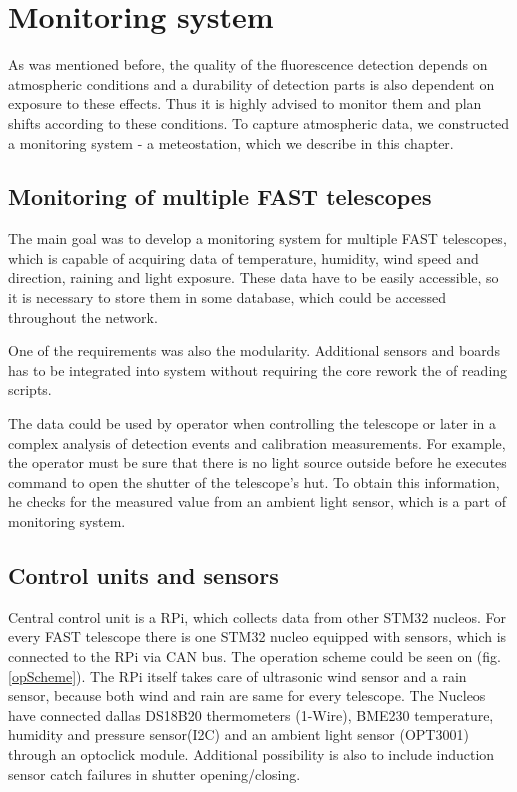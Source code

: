 
\chapter{Monitoring system}
As was mentioned before, the quality of the fluorescence detection depends on atmospheric conditions and a durability of detection parts is also dependent on exposure to these effects. Thus it is highly advised to monitor them and plan shifts according to these conditions. To capture atmospheric data, we constructed a monitoring system - a meteostation, which we describe in this chapter.
\section{Monitoring of multiple FAST telescopes}
The main goal was to develop a monitoring system for multiple FAST telescopes, which is capable of acquiring data of temperature, humidity, wind speed and direction, raining and light exposure. These data have to be easily accessible, so it is necessary to store them in some database, which could be accessed throughout the network.
\par
One of the requirements was also the modularity. Additional sensors and boards has to be integrated into system without requiring the core rework the of reading scripts.

\par
The data could be used by operator when controlling the telescope or later in a complex analysis of detection events and calibration measurements. For example, the operator must be sure that there is no light source outside before he executes command to open the shutter of the telescope's hut. To obtain this information, he checks for the measured value from an ambient light sensor, which is a part of monitoring system.
\par

\section{Control units and sensors}
Central control unit is a RPi, which collects data from other STM32 nucleos. For every FAST telescope there is one STM32 nucleo equipped with sensors, which is connected to the RPi via CAN bus. The operation scheme could be seen on (fig. \ref{opScheme}). The RPi itself takes care of ultrasonic wind sensor and a rain sensor, because both wind and rain are same for every telescope. The Nucleos have connected dallas DS18B20 thermometers (1-Wire), BME230 temperature, humidity and pressure sensor(I2C) and an ambient light sensor (OPT3001) through an optoclick module. Additional possibility is also to include induction sensor catch failures in shutter opening/closing.


